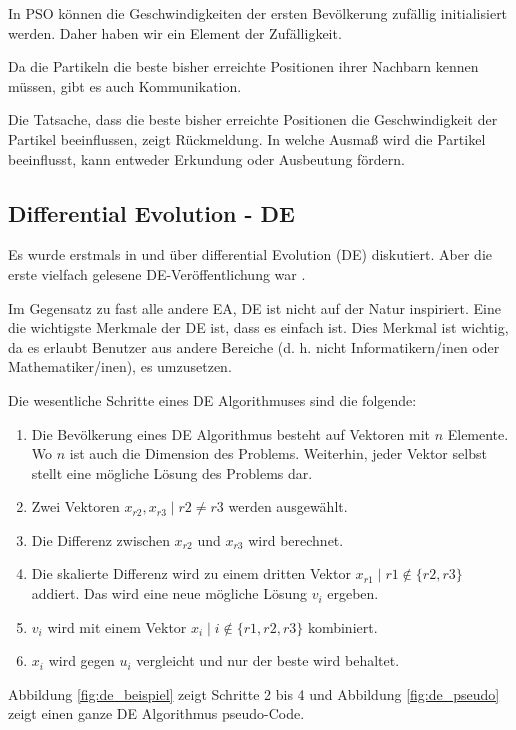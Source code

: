 \documentclass[twoside,twocolumn]{article}
\begin{document}
In PSO können die Geschwindigkeiten der ersten Bevölkerung zufällig initialisiert werden. Daher haben wir ein Element der Zufälligkeit.\par
Da die Partikeln die beste bisher erreichte Positionen ihrer Nachbarn kennen müssen, gibt es auch Kommunikation.\par
Die Tatsache, dass die beste bisher erreichte Positionen die Geschwindigkeit der Partikel beeinflussen, zeigt Rückmeldung. In welche Ausmaß wird die Partikel beeinflusst, kann entweder Erkundung oder Ausbeutung fördern.

\subsection{Differential Evolution - DE}
Es wurde erstmals in \cite{storn_de_a} und \cite{storn_de_b} über differential Evolution (DE) diskutiert. Aber die erste vielfach gelesene DE-Veröffentlichung war \cite{price_storn_de}.\par
Im Gegensatz zu fast alle andere EA, DE ist nicht auf der Natur inspiriert. Eine die wichtigste Merkmale der DE ist, dass es einfach ist. Dies Merkmal ist wichtig, da es erlaubt Benutzer aus andere Bereiche (d. h. nicht Informatikern/inen oder Mathematiker/inen), es umzusetzen.\par
Die wesentliche Schritte eines DE Algorithmuses sind die folgende:

\begin{enumerate}
\item Die Bevölkerung eines DE Algorithmus besteht auf Vektoren mit $n$ Elemente. Wo $n$ ist auch die Dimension des Problems. Weiterhin, jeder Vektor selbst stellt eine mögliche Lösung des Problems dar.
\item Zwei Vektoren $x_{r2}, x_{r3} \mid r2 \neq r3$ werden ausgewählt.
\item Die Differenz zwischen $x_{r2}$ und $x_{r3}$ wird berechnet.
\item Die skalierte Differenz wird zu einem dritten Vektor $x_{r1} \mid r1 \notin \{ r2, r3 \}$ addiert. Das wird eine neue mögliche Lösung $v_i$ ergeben.
\item $v_i$ wird mit einem Vektor $x_i \mid i \notin \{ r1, r2, r3 \}$ kombiniert.
\item $x_i$ wird gegen $u_i$ vergleicht und nur der beste wird behaltet.
\end{enumerate}

Abbildung \ref{fig:de_beispiel} zeigt Schritte 2 bis 4 und Abbildung \ref{fig:de_pseudo} zeigt einen ganze DE Algorithmus pseudo-Code.\par
\end{document}
